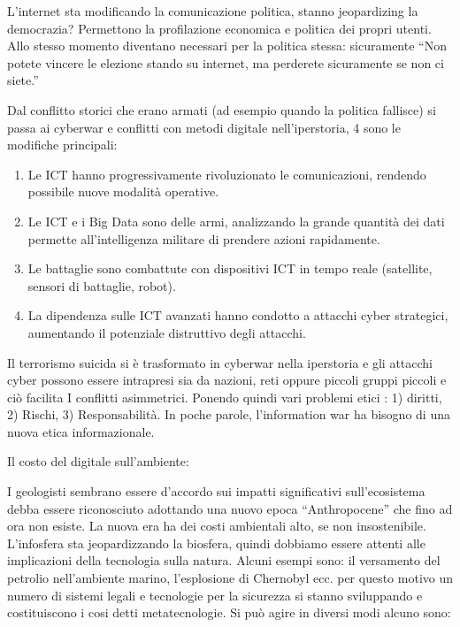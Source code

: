 \documentclass[a4page, 11pt]{article}
\begin{document}
L'internet sta modificando la comunicazione politica, stanno
jeopardizing la democrazia? Permettono la profilazione economica e
politica dei propri utenti. Allo stesso momento diventano necessari per
la politica stessa: sicuramente ``Non potete vincere le elezione stando
su internet, ma perderete sicuramente se non ci siete.''

Dal conflitto storici che erano armati (ad esempio quando la politica
fallisce) si passa ai cyberwar e conflitti con metodi digitale
nell'iperstoria, 4 sono le modifiche principali:

\begin{enumerate}
	\def\labelenumi{\arabic{enumi})}
	 
	\item
	Le ICT hanno progressivamente rivoluzionato le comunicazioni, rendendo
	possibile nuove modalità operative.
	\item
	Le ICT e i Big Data sono delle armi, analizzando la grande quantità
	dei dati permette all'intelligenza militare di prendere azioni
	rapidamente.
	\item
	Le battaglie sono combattute con dispositivi ICT in tempo reale
	(satellite, sensori di battaglie, robot).
	\item
	La dipendenza sulle ICT avanzati hanno condotto a attacchi cyber
	strategici, aumentando il potenziale distruttivo degli attacchi.
\end{enumerate}

Il terrorismo suicida si è trasformato in cyberwar nella iperstoria e
gli attacchi cyber possono essere intrapresi sia da nazioni, reti oppure
piccoli gruppi piccoli e ciò facilita I conflitti asimmetrici. Ponendo
quindi vari problemi etici : 1) diritti, 2) Rischi, 3) Responsabilità.
In poche parole, l'information war ha bisogno di una nuova etica
informazionale.

Il costo del digitale sull'ambiente:

I geologisti sembrano essere d'accordo sui impatti significativi
sull'ecosistema debba essere riconosciuto adottando una nuovo epoca
``Anthropocene'' che fino ad ora non esiste. La nuova era ha dei costi
ambientali alto, se non insostenibile. L'infosfera sta jeopardizzando la
biosfera, quindi dobbiamo essere attenti alle implicazioni della
tecnologia sulla natura. Alcuni esempi sono: il versamento del petrolio
nell'ambiente marino, l'esplosione di Chernobyl ecc. per questo motivo
un numero di sistemi legali e tecnologie per la sicurezza si stanno
sviluppando e costituiscono i cosi detti metatecnologie. Si può agire in
diversi modi alcuno sono:
\end{document}
